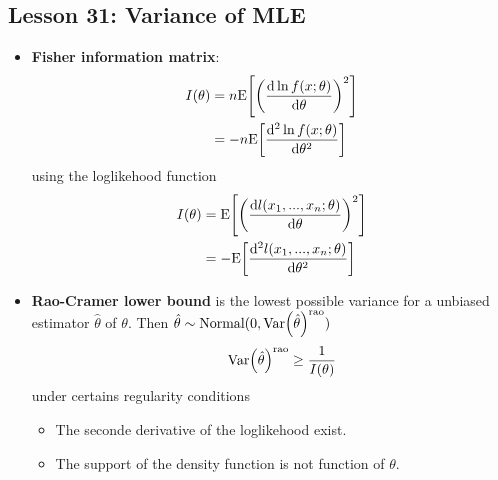 \documentclass[10pt, french]{article}
\begin{document}
\begin{multicols*}{3}
\section*{Lesson 31: Variance of MLE}
\begin{itemize}[align=left,leftmargin=*]
    \item \textbf{Fisher information matrix}:
    \begin{align*}
        I(\theta) &= n \mathrm{E} {\left[ \left( \frac{\mathop{}\!\mathrm{d} \ln f(x;\theta)}{\mathop{}\!\mathrm{d}{\theta}} \right)^2 \right]} \\
                  &= -n \mathrm{E} {\left[ \frac{\mathop{}\!\mathrm{d}^2 \ln f(x;\theta)}{\mathop{}\!\mathrm{d} \theta^2} \right]}
    \end{align*}
    using the loglikehood function
    \begin{align*}
        I(\theta) &= \mathrm{E} {\left[ \left( \frac{\mathop{}\!\mathrm{d} l(x_1,...,x_n;\theta)}{\mathop{}\!\mathrm{d}{\theta}} \right)^2 \right]} \\
                  &= -\mathrm{E} {\left[ \frac{\mathop{}\!\mathrm{d}^2 l(x_1,...,x_n;\theta)}{\mathop{}\!\mathrm{d} \theta^2} \right]}
    \end{align*}
    \item \textbf{Rao-Cramer lower bound}\label{Def:rao-cramer bound} is the lowest possible variance for a unbiased estimator $\hat{\theta}$ of $\theta$. Then $\hat{\theta} \sim \mathrm{Normal(0, \mathrm{Var} {\left( \hat{\theta} \right)}^{\textrm{rao}})}$
    \[\hspace*{0.5cm} \mathrm{Var} {\left( \hat{\theta} \right)}^{\textrm{rao}} \geq \frac{1}{I(\theta)} \]
    under certains regularity conditions
    \begin{itemize}
        \item The seconde derivative of the loglikehood exist.
        \item The support of the density function is not function of $\theta$.
    \end{itemize}
\end{itemize}


\end{multicols*}
\end{document}
